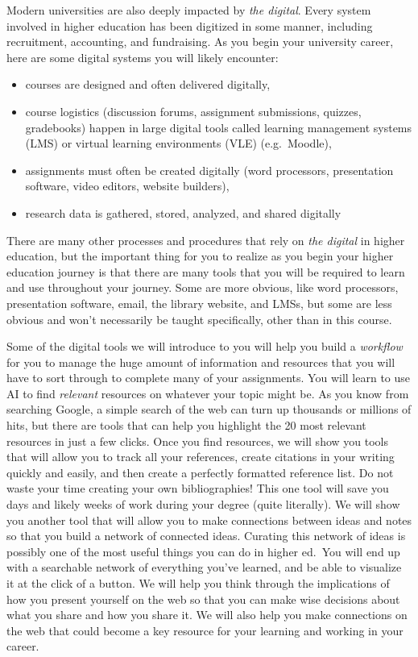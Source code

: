 \documentclass[
]{book}
\providecommand{\tightlist}{%
  \setlength{\itemsep}{0pt}\setlength{\parskip}{0pt}}
\theoremstyle{definition}
\theoremstyle{definition}
\theoremstyle{definition}
\theoremstyle{definition}
\theoremstyle{remark}
\begin{document}
Modern universities are also deeply impacted by \emph{the digital}. Every system involved in higher education has been digitized in some manner, including recruitment, accounting, and fundraising. As you begin your university career, here are some digital systems you will likely encounter:

\begin{itemize}
\tightlist
\item
  courses are designed and often delivered digitally,
\item
  course logistics (discussion forums, assignment submissions, quizzes, gradebooks) happen in large digital tools called learning management systems (LMS) or virtual learning environments (VLE) (e.g.~Moodle),
\item
  assignments must often be created digitally (word processors, presentation software, video editors, website builders),
\item
  research data is gathered, stored, analyzed, and shared digitally
\end{itemize}

There are many other processes and procedures that rely on \emph{the digital} in higher education, but the important thing for you to realize as you begin your higher education journey is that there are many tools that you will be required to learn and use throughout your journey. Some are more obvious, like word processors, presentation software, email, the library website, and LMSs, but some are less obvious and won't necessarily be taught specifically, other than in this course.

Some of the digital tools we will introduce to you will help you build a \emph{workflow} for you to manage the huge amount of information and resources that you will have to sort through to complete many of your assignments. You will learn to use AI to find \emph{relevant} resources on whatever your topic might be. As you know from searching Google, a simple search of the web can turn up thousands or millions of hits, but there are tools that can help you highlight the 20 most relevant resources in just a few clicks. Once you find resources, we will show you tools that will allow you to track all your references, create citations in your writing quickly and easily, and then create a perfectly formatted reference list. Do not waste your time creating your own bibliographies! This one tool will save you days and likely weeks of work during your degree (quite literally). We will show you another tool that will allow you to make connections between ideas and notes so that you build a network of connected ideas. Curating this network of ideas is possibly one of the most useful things you can do in higher ed.~You will end up with a searchable network of everything you've learned, and be able to visualize it at the click of a button. We will help you think through the implications of how you present yourself on the web so that you can make wise decisions about what you share and how you share it. We will also help you make connections on the web that could become a key resource for your learning and working in your career.
\end{document}
